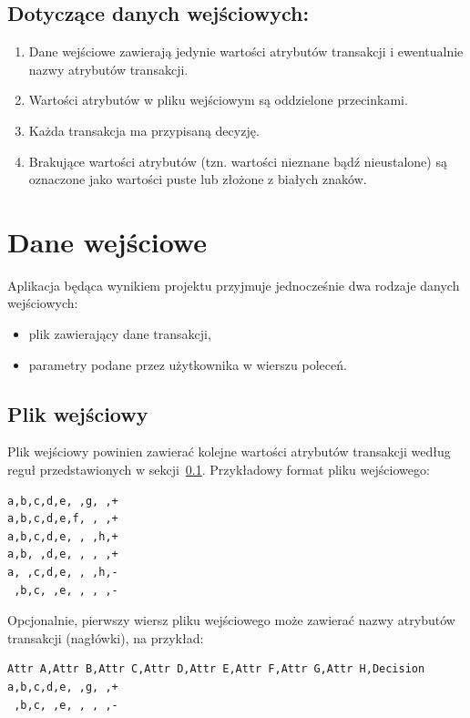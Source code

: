 \documentclass[a4paper,10pt]{article}
\begin{document}
 \subsection{Dotyczące danych wejściowych:} \label{sec:assumptions:input}
  \begin{enumerate}
   \item Dane wejściowe zawierają jedynie wartości atrybutów transakcji i ewentualnie nazwy atrybutów transakcji.
   \item Wartości atrybutów w pliku wejściowym są oddzielone przecinkami.
   \item Każda transakcja ma przypisaną decyzję.
   \item Brakujące wartości atrybutów (tzn. wartości nieznane bądź nieustalone) są oznaczone jako wartości puste lub złożone z białych znaków.
  \end{enumerate}



\section{Dane wejściowe} \label{sec:input}
Aplikacja będąca wynikiem projektu przyjmuje jednocześnie dwa rodzaje danych wejściowych:

\begin{itemize}
 \item plik zawierający dane transakcji,
 \item parametry podane przez użytkownika w wierszu poleceń.
\end{itemize}

 \subsection{Plik wejściowy} \label{sec:input:file}
 Plik wejściowy powinien zawierać kolejne wartości atrybutów transakcji według reguł przedstawionych w sekcji~\ref{sec:assumptions:input}.
 Przykładowy format pliku wejściowego:
 
\begin{verbatim}
a,b,c,d,e, ,g, ,+
a,b,c,d,e,f, , ,+
a,b,c,d,e, , ,h,+
a,b, ,d,e, , , ,+
a, ,c,d,e, , ,h,-
 ,b,c, ,e, , , ,-
\end{verbatim}

 Opcjonalnie, pierwszy wiersz pliku wejściowego może zawierać nazwy atrybutów transakcji (nagłówki), na przykład:

\begin{verbatim}
Attr A,Attr B,Attr C,Attr D,Attr E,Attr F,Attr G,Attr H,Decision
a,b,c,d,e, ,g, ,+
 ,b,c, ,e, , , ,-
\end{verbatim}
\end{document}
